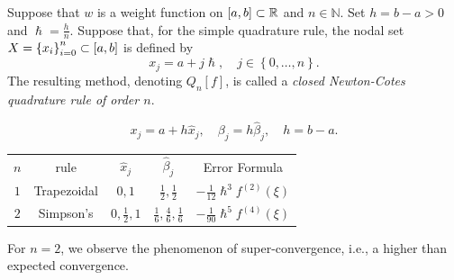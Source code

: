 \begin{frame}
    \begin{definition}
        Suppose that $w$ is a weight function on
        \begin{math}
            \left[a,b\right]\subset
            \mathbb{R}
        \end{math}
        and $n\in\mathbb{N}$.
        Set $h=b-a>0$ and $\hslash=\frac{h}{n}$.
        Suppose that, for the simple quadrature rule, the nodal set
        $X={\left\{x_{i}\right\}}_{i=0}^{n}\subset\left[a,b\right]$ is defined by
        \begin{equation*}
            x_{j}=
            a+j\hslash,\quad
            j\in\left\{0,\dotsc,n\right\}.
        \end{equation*}
        The resulting method, denoting $Q_{n}\left[f\right]$, is
        called a \emph{closed Newton-Cotes quadrature rule of order $n$}.
    \end{definition}

    \begin{example}[Newton-Cotes quadrature rules of order $n=1,2$ and weight function $w\equiv 1$ on $\interval$]
        \begin{equation*}
            x_{j}=
            a+h\widehat{x}_{j},\quad
            \beta_{j}=h\widehat{\beta}_{j},\quad
            h=b-a.
        \end{equation*}

        \begin{table}[ht!]
            \centering
            \begin{tabular}{ccccc}
                \hline
                $n$ & rule                                                         & $\widehat{x}_{j}$ & $\widehat{\beta}_{j}$
                    & Error Formula                                                                                                              \\
                $1$ & Trapezoidal                                                  & $0,1$             & $\frac{1}{2}, \frac{1}{2}$
                    & $-\frac{1}{12}\hslash^{3}f^{\left(2\right)}\left(\xi\right)$                                                               \\
                $2$ & Simpson's                                                    & $0,\frac{1}{2},1$ & $\frac{1}{6}, \frac{4}{6}, \frac{1}{6}$
                    & $-\frac{1}{90}\hslash^{5}f^{\left(4\right)}\left(\xi\right)$                                                               \\
                \hline
            \end{tabular}
        \end{table}
        For $n=2$, we observe the phenomenon of
        \alert{super-convergence}, i.e., a higher than expected convergence.


\end{example}
\end{frame}
